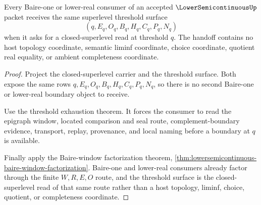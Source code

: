 \begin{theorem}
\label{thm:lowersemicontinuous-baire-one-superlevel-handoff}
Every Baire-one or lower-real consumer of an accepted $\LowerSemicontinuousUp$ packet receives the same superlevel threshold surface
$$
(q,E_q,O_q,B_q,H_q,C_q,P_q,N_q)
$$
when it asks for a closed-superlevel read at threshold $q$. The handoff contains no host topology coordinate, semantic liminf coordinate, choice coordinate, quotient real equality, or ambient completeness coordinate.
\end{theorem}
\begin{proof}
Project the closed-superlevel carrier and the threshold surface. Both expose the same rows $q,E_q,O_q,B_q,H_q,C_q,P_q,N_q$, so there is no second Baire-one or lower-real boundary object to receive.

Use the threshold exhaustion theorem. It forces the consumer to read the epigraph window, located comparison and seal route, complement-boundary evidence, transport, replay, provenance, and local naming before a boundary at $q$ is available.

Finally apply the Baire-window factorization theorem, \autoref{thm:lowersemicontinuous-baire-window-factorization}. Baire-one and lower-real consumers already factor through the finite $W,R,E,O$ route, and the threshold surface is the closed-superlevel read of that same route rather than a host topology, liminf, choice, quotient, or completeness coordinate.
\end{proof}

